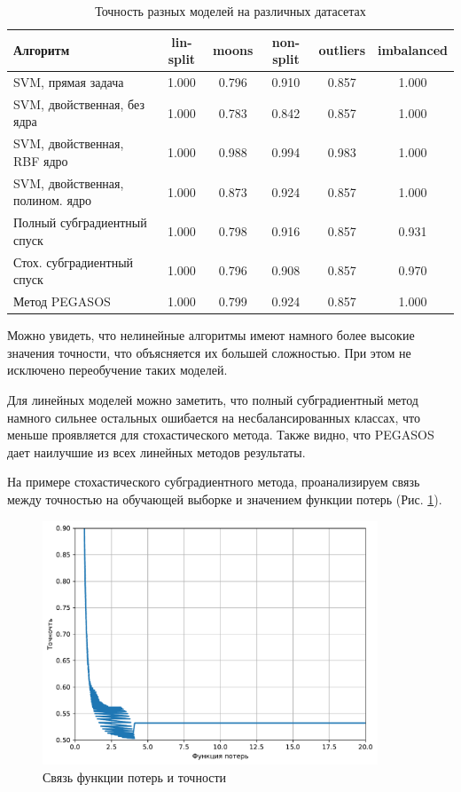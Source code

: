 \documentclass[12pt,fleqn,unicode]{article}
\begin{document}
\begin{table}[h!]
	\centering
	\begin{tabular}{|l|c|c|c|c|c|}
\hline
Алгоритм & lin-split & moons & non-split & outliers & imbalanced\\ \hline
SVM, прямая задача & 1.000 & 0.796 & 0.910 & 0.857 & 1.000 \\ \hline
SVM, двойственная, без ядра & 1.000 & 0.783 & 0.842 & 0.857 & 1.000 \\ \hline
SVM, двойственная, RBF ядро & 1.000 & 0.988 & 0.994 & 0.983 & 1.000 \\ \hline
SVM, двойственная, полином. ядро & 1.000 & 0.873 & 0.924 & 0.857 & 1.000 \\ \hline
Полный субградиентный спуск & 1.000 & 0.798 & 0.916 & 0.857 & 0.931 \\ \hline
Стох. субградиентный спуск & 1.000 & 0.796 & 0.908 & 0.857 & 0.970 \\ \hline
Метод PEGASOS & 1.000 & 0.799 & 0.924 & 0.857 & 1.000 \\ \hline
	\end{tabular}
	\caption{Точность разных моделей на различных датасетах}
	\label{tab4}
\end{table}

Можно увидеть, что нелинейные алгоритмы имеют намного более высокие значения точности, что объясняется их
большей сложностью. При этом не исключено переобучение таких моделей. 

Для линейных моделей можно заметить, что
полный субградиентный метод намного сильнее остальных ошибается на несбалансированных классах, что меньше
проявляется для стохастического метода. Также видно, что PEGASOS дает наилучшие из всех линейных методов результаты.

На примере стохастического субградиентного метода, проанализируем связь между точностью на обучающей выборке
и значением функции потерь (Рис. \ref{fig2}).

\begin{figure}[h!]
	\centering
	\caption{Связь функции потерь и точности}
	\label{fig2}
	\includegraphics[width=10cm]{../pict/acc-func.pdf}
\end{figure}
\end{document}
